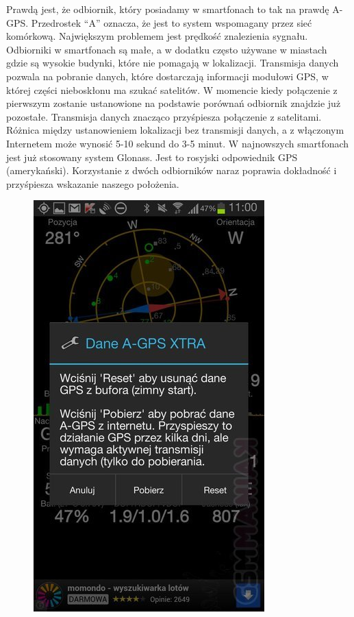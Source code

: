Prawdą jest, że odbiornik, który posiadamy w smartfonach to tak na prawdę A-GPS. Przedrostek “A” oznacza, że jest to system wspomagany przez sieć komórkową. Największym problemem jest prędkość znalezienia sygnału. Odbiorniki w smartfonach są małe, a w dodatku często używane w miastach gdzie są wysokie budynki, które nie pomagają w lokalizacji. Transmisja danych pozwala na pobranie danych, które dostarczają informacji modułowi GPS, w której części nieboskłonu ma szukać satelitów. W momencie kiedy połączenie z pierwszym zostanie ustanowione na podstawie porównań odbiornik znajdzie już pozostałe. Transmisja danych znacząco przyśpiesza połączenie z satelitami. Różnica między ustanowieniem lokalizacji bez transmisji danych, a z włączonym Internetem może wynosić 5-10 sekund do 3-5 minut. W najnowszych smartfonach jest już stosowany system Glonass. Jest to rosyjski odpowiednik GPS (amerykański). Korzystanie z dwóch odbiorników naraz poprawia dokładność i przyśpiesza wskazanie naszego położenia.
\begin{figure}[H]
\centering
\includegraphics[scale=0.5]{czlonkowie/5/2ss.jpg}
\end{figure}
